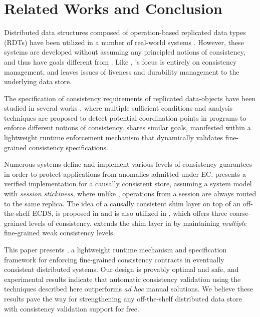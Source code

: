 \documentclass[authorversion]{sig-alternate-05-2015}
\begin{document}
\section{Related Works and Conclusion}

Distributed data structures composed of operation-based replicated
data types (RDTs) \cite{rdt,crdt} have been utilized in a number of
real-world systems \cite{tango,cassandra}.  However, these systems are
developed without assuming any principled notions of consistency, and
thus have goals different from \tool.  Like \cite{bolton}, \tool's
focus is entirely on consistency management, and leaves issues of
liveness and durability management to the underlying data store.


The specification of consistency requirements of replicated
data-objects have been studied in several works
\cite{autoc,mahsa,bloom}, where multiple sufficient conditions and
analysis techniques are proposed to detect potential coordination
points in programs to enforce different notions of consistency.  \tool
shares similar goals, manifested within a lightweight runtime
enforcement mechanism that dynamically validates fine-grained
consistency specifications.

Numerous systems \cite{geofast,petersen,cbs,chapar,bolton,quelea}
define and implement various levels of consistency guarantees in order
to protect applications from anomalies admitted under EC.
\cite{chapar} presents a verified implementation for a causally
consistent store, assuming a system model with \emph{session
  stickiness}, where unlike \tool, operations from a session are
always routed to the same replica. The idea of a causally consistent
shim layer on top of an off-the-shelf ECDS, is proposed in
\cite{bolton} and is also utilized in \cite{quelea}, which offers
three coarse-grained levels of consistency.  \tool extends the shim
layer in \cite{quelea} by maintaining \emph{multiple} fine-grained
weak consistency levels.

This paper presents \tool, a lightweight runtime mechanism and
specification framework for enforcing fine-grained consistency
contracts in eventually consistent distributed systems.  Our design is
provably optimal and safe, and experimental results indicate that
automatic consistency validation using the techniques described here
outperforms \emph{ad hoc} manual solutions.  We believe these results
pave the way for strengthening any off-the-shelf distributed data
store with consistency validation support for free.









%

%
%
\end{document}
